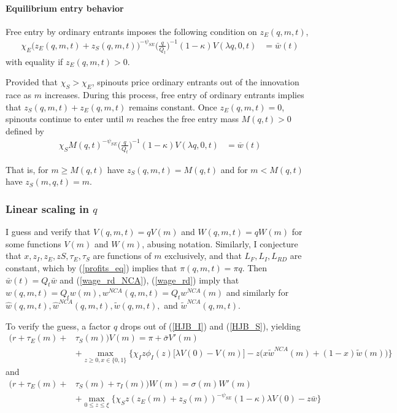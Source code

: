 \documentclass[12pt,english]{article}
\theoremstyle{remark}
\begin{document}
\paragraph{Equilibrium entry behavior}

Free entry by ordinary entrants imposes the following condition on $z_E(q,m,t)$, 
\begin{align}
\chi_E \big( z_E(q,m,t) + z_S(q,m,t) \big)^{-\psi_{SE}} \Big(\frac{q}{Q_t}\Big)^{-1}  (1-\kappa) V(\lambda q,0,t)  &= \bar{w}(t)\label{free_entry_entrants}
\end{align}
with equality if $z_E(q,m,t) > 0$. 

Provided that $\chi_S > \chi_E$, spinouts price ordinary entrants out of the innovation race as $m$ increases. During this process, free entry of ordinary entrants implies that $z_S(q,m,t) + z_E(q,m,t)$ remains constant. Once $z_E(q,m,t) = 0$, spinouts continue to enter until $m$ reaches the free entry mass $M(q,t) > 0$ defined by
\begin{align}
	\chi_S  M(q,t)^{-\psi_{SE}}\Big(\frac{q}{Q_t}\Big)^{-1} (1-\kappa) V(\lambda q,0,t)  &= \overline{w}(t) \label{free_entry_spinouts}
\end{align}

That is, for $m \ge M(q,t)$ have $z_S(q,m,t) = M(q,t)$ and for $m < M(q,t)$ have $z_S(m,q,t) = m$. 


\subsubsection{Linear scaling in $q$}

I guess and verify that $V(q,m,t) = q V(m)$ and $W(q,m,t) = qW(m)$ for some functions $V(m)$ and $W(m)$, abusing notation. Similarly, I conjecture that $x,z_I,z_E,zS,\tau_E,\tau_S$ are functions of $m$ exclusively, and that $L_F,L_I,L_{RD}$ are constant, which by (\ref{profits_eq}) implies that $\pi(q,m,t) = \pi q$. Then $\bar{w}(t) = Q_t \bar{w}$ and (\ref{wage_rd_NCA}), (\ref{wage_rd}) imply that $w(q,m,t) = Q_t w(m),w^{NCA}(q,m,t) = Q_tw^{NCA}(m)$ and similarly for $\hat{w}(q,m,t),\hat{w}^{NCA}(q,m,t),\tilde{w}(q,m,t),$ and $\tilde{w}^{NCA}(q,m,t)$. 

To verify the guess, a factor $q$ drops out of (\ref{HJB_I}) and (\ref{HJB_S}), yielding
\begin{align}
(r + \tau_E(m) + &\tau_S(m)) V(m) = \pi + \bar{\sigma}V'(m) \nonumber \\
       &+ \max_{z \ge 0, x \in \{0,1\}} \Big\{  \chi_I z \phi_I(z) \Big[\lambda V(0) - V(m) \Big] - z \Big(x \tilde{w}^{NCA}(m) + (1-x) \tilde{w}(m) \Big) \Big\} \label{BGP_HJB_I}
\end{align} 
and 
\begin{align}
(r + \tau_E(m) + &\tau_S(m) + \tau_I(m))W(m) = \sigma(m) W'(m) \nonumber \\
		&+ \max_{0 \le z \le \xi} \Big\{  \chi_S z (z_E(m) + z_S(m))^{-\psi_{SE}} (1-\kappa) \lambda V(0) - z \bar{w} \Big\} \label{BGP_HJB_S} 
\end{align}
\end{document}
